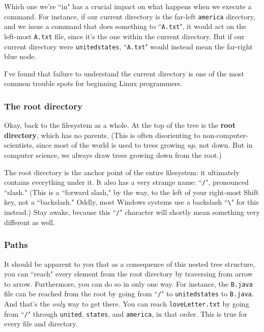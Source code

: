 Which one we're ``in" has a crucial impact on what happens when we execute a
command. For instance, if our current directory is the far-left
\texttt{america} directory, and we issue a command that does something to
``\texttt{A.txt}", it would act on the left-most \texttt{A.txt} file, since
it's the one within the current directory. But if our current directory were
\texttt{unitedstates}, ``\texttt{A.txt}" would instead mean the far-right blue
node.

I've found that failure to understand the current directory is one of the most
common trouble spots for beginning Linux programmers.

\subsubsection{The root directory}

Okay, back to the filesystem as a whole. At the top of the tree is the
\textbf{root directory}, which has no parents. (This is often disorienting to
non-computer-scientists, since most of the world is used to trees growing
\textit{up}, not down. But in computer science, we always draw trees growing
down from the root.)

The root directory is the anchor point of the entire filesystem: it ultimately
contains everything under it. It also has a very strange name: ``\texttt{/}",
pronounced ``slash." (This is a ``forward slash," by the way, to the left of
your right-most Shift key, not a ``backslash." Oddly, most Windows systems
use a backslash ``\texttt{\textbackslash}" for this instead.) Stay awake,
because this ``\texttt{/}" character will shortly mean something very
different as well.

\subsubsection{Paths}

It should be apparent to you that as a consequence of this nested tree
structure, you can ``reach" every element from the root directory by
traversing from arrow to arrow. Furthermore, you can do so in only one way.
For instance, the \texttt{B.java} file can be reached from the root by going
from ``\texttt{/}" to \texttt{unitedstates} to \texttt{B.java}. And that's the
\textit{only} way to get there. You can reach \texttt{loveLetter.txt} by going
from ``\texttt{/}" through \texttt{united}, \texttt{states}, and
\texttt{america}, in that order. This is true for every file and directory.

